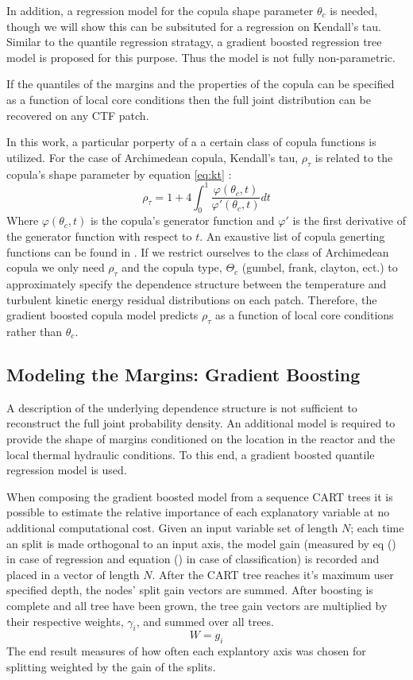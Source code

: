 In addition, a regression model for the copula shape parameter $\theta_c$ is needed, though we will show this can be subsituted for a regression on Kendall's tau.  Similar to the quantile regression stratagy, a gradient boosted regression tree model is proposed for this purpose. Thus the model is not fully non-parametric.

If the quantiles of the margins and the properties of the copula can be specified as a function of local core conditions then the full joint distribution can be recovered on any CTF patch.

In this work, a particular porperty of a a certain class of copula functions is utilized.
For the case of Archimedean copula, Kendall's tau, $\rho_\tau$ is
related to the copula's shape parameter by equation \ref{eq:kt} \cite{Nelsen2006}:
\begin{equation}
\rho_\tau = 1 + 4 \int_0^1 \frac{\varphi(\theta_c,t)}{\varphi'(\theta_c, t)}dt
\label{eq:kt}
\end{equation}
Where $\varphi(\theta_c, t)$ is the copula's generator function and $\varphi'$ is the first derivative of the generator function with respect to $t$.  An exaustive list of copula generting functions can be found in \cite{Nelsen2006}.
If we restrict ourselves to the class of Archimedean copula we only need $\rho_\tau$ and the copula type, $\Theta_c$ (gumbel, frank, clayton, ect.) to approximately specify the dependence structure between the temperature and turbulent kinetic energy residual distributions on each patch.  Therefore, the gradient boosted copula model predicts $\rho_\tau$ as a function of local core conditions rather than $\theta_c$.

\subsection{Modeling the Margins: Gradient Boosting}

A description of the underlying dependence structure is not sufficient to reconstruct the full joint probability density.  An additional model is required to provide the shape of margins conditioned on the location in the reactor and the local thermal hydraulic conditions.  To this end, a gradient boosted quantile regression model is used.

When composing the gradient boosted model from a sequence CART trees it is possible to estimate the relative importance of each explanatory variable at no additional computational cost.  Given an input variable set of length $N$; each time an split is made orthogonal to an input axis, the model gain (measured by eq () in case of regression and equation () in case of classification) is recorded and placed in a vector of length $N$.  After the CART tree reaches it's maximum user specified depth, the nodes' split gain vectors are summed.  After boosting is complete and all tree have been grown, the tree gain vectors are multiplied by their respective weights, $\gamma_i$, and summed over all trees.
\begin{equation}
W = g_i
\end{equation}
The end result measures of how often each explantory axis was chosen for splitting weighted by the gain of the splits.


